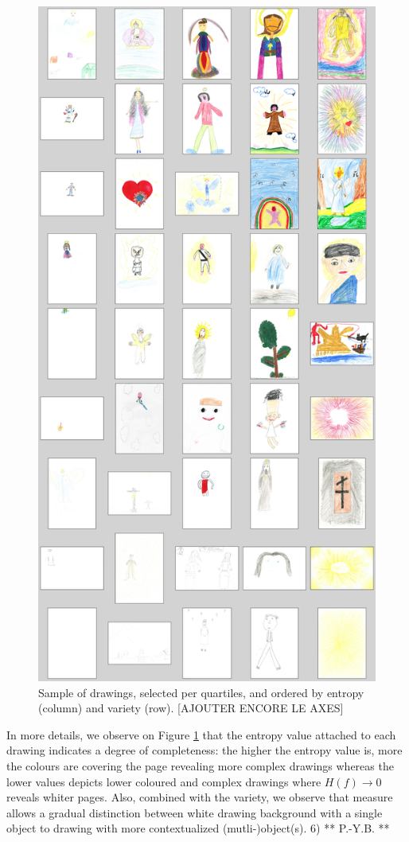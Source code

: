 \documentclass[11pt,a4paper]{article}
\begin{document}
\begin{figure}[h!]
	\centering
	\includegraphics[width=0.8\linewidth]{figures/colors-grille.png}
	\caption{Sample of drawings, selected per quartiles, and ordered by entropy (column) and variety (row). {\color{red}[AJOUTER ENCORE LE AXES]}}
	\label{fig:grille}
\end{figure}

In more details, we observe on Figure \ref{fig:grille} that the entropy value attached to each drawing indicates a degree of completeness: the higher the entropy value is, more the colours are covering the page revealing more complex drawings whereas the lower values depicts lower coloured and complex drawings where $H(f) \rightarrow 0$ reveals whiter pages.
Also, combined with the variety, we observe that measure allows a gradual distinction between white drawing background with a single object to drawing with more contextualized (mutli-)object(s).
{\color{red} 6) ** P.-Y.B. **}
\end{document}

